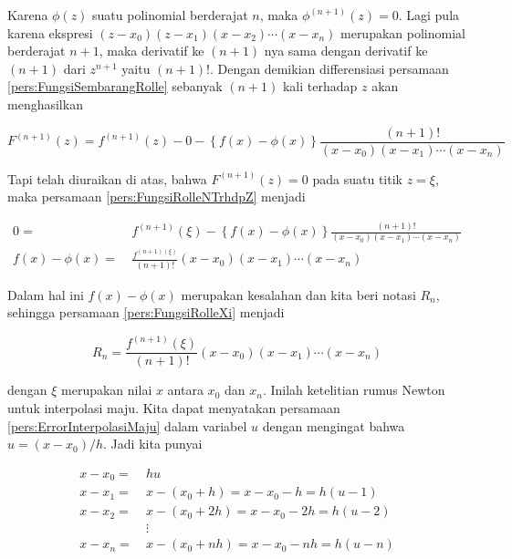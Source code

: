 Karena $\phi(z)$ suatu polinomial berderajat $n$, maka $\phi^{(n+1)}(z)=0$. Lagi pula karena ekspresi $(z-x_0)(z-x_1)(x-x_2)\cdots(x-x_n)$ merupakan polinomial berderajat $n+1$, maka derivatif ke $(n+1)$ nya sama dengan derivatif ke $(n+1)$ dari $z^{n+1}$ yaitu $(n+1)!$. Dengan demikian differensiasi persamaan \ref{pers:FungsiSembarangRolle} sebanyak $(n+1)$ kali terhadap $z$ akan menghasilkan

\begin{equation}\label{pers:FungsiRolleNTrhdpZ}
F^{(n+1)}(z) = f^{(n+1)}(z) - 0 - \left\{ f(x) - \phi(x) \right\} \frac{(n+1)!}{(x-x_0)(x-x_1)\cdots(x-x_n)}
\end{equation}

Tapi telah diuraikan di atas, bahwa $F^{(n+1)}(z) = 0$ pada suatu titik $z = \xi$, maka persamaan \ref{pers:FungsiRolleNTrhdpZ} menjadi

\begin{equation}\label{pers:FungsiRolleXi}
\begin{split}
0 =~& f^{(n+1)}(\xi) - \left\{ f(x) - \phi(x) \right\}\frac{(n+1)!}{(x-x_0)(x-x_1)\cdots(x-x_n)}\\
f(x) - \phi(x) =~& \frac{f^{(n+1)(\xi)}}{(n+1)!}(x-x_0)(x-x_1)\cdots(x-x_n)
\end{split}
\end{equation}

Dalam hal ini $f(x) - \phi(x)$ merupakan kesalahan dan kita beri notasi $R_n$, sehingga persamaan \ref{pers:FungsiRolleXi} menjadi

\begin{equation}\label{pers:ErrorInterpolasiMaju}
R_n = \frac{f^{(n+1)}(\xi)}{(n+1)!}(x-x_0)(x-x_1)\cdots(x-x_n)
\end{equation}

dengan $\xi$ merupakan nilai $x$ antara $x_0$ dan $x_n$. Inilah ketelitian rumus Newton untuk interpolasi maju. Kita dapat menyatakan persamaan \ref{pers:ErrorInterpolasiMaju} dalam variabel $u$ dengan mengingat bahwa $u = (x-x_0)/h$. Jadi kita punyai

\begin{equation*}
\begin{split}
x-x_0 =~& hu\\
x-x_1 =~& x-(x_0 + h) = x-x_0-h = h(u-1)\\
x-x_2 =~& x-(x_0 + 2h) = x-x_0-2h = h(u-2)\\
& \vdots\\
x-x_n =~& x-(x_0 + nh) = x-x_0-nh = h(u-n)
\end{split}
\end{equation*}

